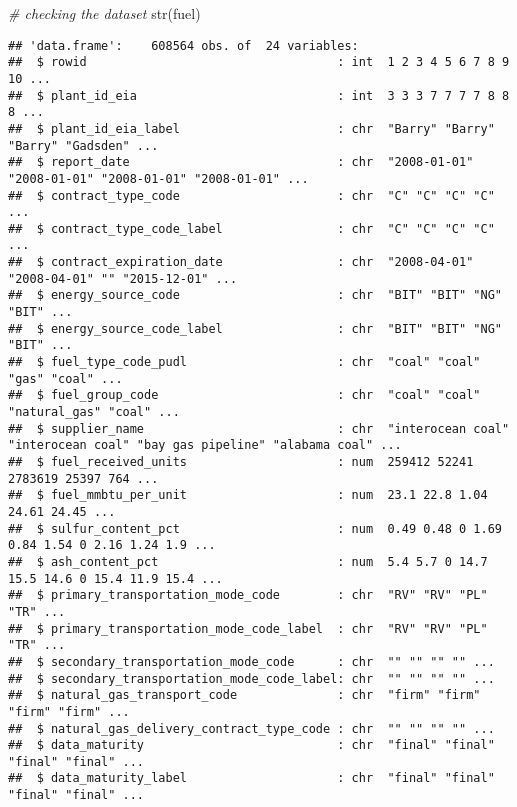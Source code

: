 \documentclass[
]{article}
\newenvironment{Shaded}{\begin{snugshade}}{\end{snugshade}}
\newcommand{\CommentTok}[1]{\textcolor[rgb]{0.56,0.35,0.01}{\textit{#1}}}
\newcommand{\FunctionTok}[1]{\textcolor[rgb]{0.00,0.00,0.00}{#1}}
\newcommand{\NormalTok}[1]{#1}
\begin{document}
\begin{Shaded}
\begin{Highlighting}[]
\CommentTok{\# checking the dataset}
\FunctionTok{str}\NormalTok{(fuel)}
\end{Highlighting}
\end{Shaded}

\begin{verbatim}
## 'data.frame':    608564 obs. of  24 variables:
##  $ rowid                                   : int  1 2 3 4 5 6 7 8 9 10 ...
##  $ plant_id_eia                            : int  3 3 3 7 7 7 7 8 8 8 ...
##  $ plant_id_eia_label                      : chr  "Barry" "Barry" "Barry" "Gadsden" ...
##  $ report_date                             : chr  "2008-01-01" "2008-01-01" "2008-01-01" "2008-01-01" ...
##  $ contract_type_code                      : chr  "C" "C" "C" "C" ...
##  $ contract_type_code_label                : chr  "C" "C" "C" "C" ...
##  $ contract_expiration_date                : chr  "2008-04-01" "2008-04-01" "" "2015-12-01" ...
##  $ energy_source_code                      : chr  "BIT" "BIT" "NG" "BIT" ...
##  $ energy_source_code_label                : chr  "BIT" "BIT" "NG" "BIT" ...
##  $ fuel_type_code_pudl                     : chr  "coal" "coal" "gas" "coal" ...
##  $ fuel_group_code                         : chr  "coal" "coal" "natural_gas" "coal" ...
##  $ supplier_name                           : chr  "interocean coal" "interocean coal" "bay gas pipeline" "alabama coal" ...
##  $ fuel_received_units                     : num  259412 52241 2783619 25397 764 ...
##  $ fuel_mmbtu_per_unit                     : num  23.1 22.8 1.04 24.61 24.45 ...
##  $ sulfur_content_pct                      : num  0.49 0.48 0 1.69 0.84 1.54 0 2.16 1.24 1.9 ...
##  $ ash_content_pct                         : num  5.4 5.7 0 14.7 15.5 14.6 0 15.4 11.9 15.4 ...
##  $ primary_transportation_mode_code        : chr  "RV" "RV" "PL" "TR" ...
##  $ primary_transportation_mode_code_label  : chr  "RV" "RV" "PL" "TR" ...
##  $ secondary_transportation_mode_code      : chr  "" "" "" "" ...
##  $ secondary_transportation_mode_code_label: chr  "" "" "" "" ...
##  $ natural_gas_transport_code              : chr  "firm" "firm" "firm" "firm" ...
##  $ natural_gas_delivery_contract_type_code : chr  "" "" "" "" ...
##  $ data_maturity                           : chr  "final" "final" "final" "final" ...
##  $ data_maturity_label                     : chr  "final" "final" "final" "final" ...
\end{verbatim}
\end{document}
